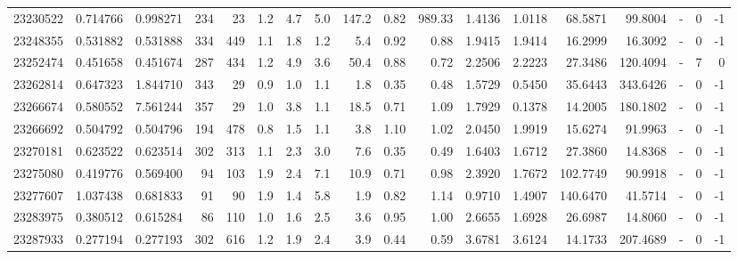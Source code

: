 \begin{tabular}{rrrrrrrrrrrrrrrlrr}
  23230522 & 0.714766 &   0.998271 &  234 &   23 &      1.2 &      4.7 &     5.0 &    147.2 &       0.82 &      989.33 &  1.4136 &  1.0118 &   68.5871 &   99.8004 &             - &        0 &         -1 \\
  23248355 & 0.531882 &   0.531888 &  334 &  449 &      1.1 &      1.8 &     1.2 &      5.4 &       0.92 &        0.88 &  1.9415 &  1.9414 &   16.2999 &   16.3092 &             - &        0 &         -1 \\
  23252474 & 0.451658 &   0.451674 &  287 &  434 &      1.2 &      4.9 &     3.6 &     50.4 &       0.88 &        0.72 &  2.2506 &  2.2223 &   27.3486 &  120.4094 &             - &        7 &          0 \\
  23262814 & 0.647323 &   1.844710 &  343 &   29 &      0.9 &      1.0 &     1.1 &      1.8 &       0.35 &        0.48 &  1.5729 &  0.5450 &   35.6443 &  343.6426 &             - &        0 &         -1 \\
  23266674 & 0.580552 &   7.561244 &  357 &   29 &      1.0 &      3.8 &     1.1 &     18.5 &       0.71 &        1.09 &  1.7929 &  0.1378 &   14.2005 &  180.1802 &             - &        0 &         -1 \\
  23266692 & 0.504792 &   0.504796 &  194 &  478 &      0.8 &      1.5 &     1.1 &      3.8 &       1.10 &        1.02 &  2.0450 &  1.9919 &   15.6274 &   91.9963 &             - &        0 &         -1 \\
  23270181 & 0.623522 &   0.623514 &  302 &  313 &      1.1 &      2.3 &     3.0 &      7.6 &       0.35 &        0.49 &  1.6403 &  1.6712 &   27.3860 &   14.8368 &             - &        0 &         -1 \\
  23275080 & 0.419776 &   0.569400 &   94 &  103 &      1.9 &      2.4 &     7.1 &     10.9 &       0.71 &        0.98 &  2.3920 &  1.7672 &  102.7749 &   90.9918 &             - &        0 &         -1 \\
  23277607 & 1.037438 &   0.681833 &   91 &   90 &      1.9 &      1.4 &     5.8 &      1.9 &       0.82 &        1.14 &  0.9710 &  1.4907 &  140.6470 &   41.5714 &             - &        0 &         -1 \\
  23283975 & 0.380512 &   0.615284 &   86 &  110 &      1.0 &      1.6 &     2.5 &      3.6 &       0.95 &        1.00 &  2.6655 &  1.6928 &   26.6987 &   14.8060 &             - &        0 &         -1 \\
  23287933 & 0.277194 &   0.277193 &  302 &  616 &      1.2 &      1.9 &     2.4 &      3.9 &       0.44 &        0.59 &  3.6781 &  3.6124 &   14.1733 &  207.4689 &             - &        0 &         -1 \\

\end{tabular}
